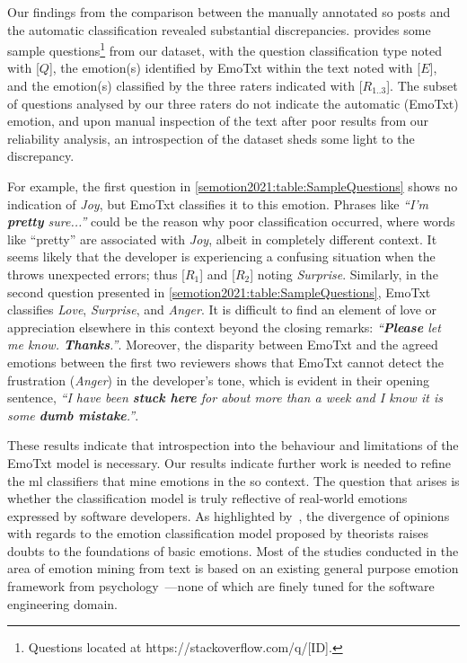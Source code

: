 Our findings from the comparison between the manually annotated \gls{so} posts and the automatic classification revealed substantial discrepancies.  provides some sample questions\footnote{Questions located at https://stackoverflow.com/q/[ID].} from our dataset, with the \citeauthor{Beyer:2018fm} question classification type noted with [$Q$], the emotion(s) identified by EmoTxt within the text noted with [$E$], and the emotion(s) classified by the three raters indicated with [$R_{1..3}$]. The subset of questions analysed by our three raters do not indicate the automatic (EmoTxt) emotion, and upon manual inspection of the text after poor results from our reliability analysis, an introspection of the dataset sheds some light to the discrepancy. 

For example, the first question in \cref{semotion2021:table:SampleQuestions} shows no indication of \textit{Joy}, but EmoTxt classifies it to this emotion. Phrases like \textit{``I'm \textbf{pretty} sure...''} could be the reason why poor classification occurred, where words like ``pretty'' are associated with \textit{Joy}, albeit in completely different context. It seems likely that the developer is experiencing a confusing situation when the  throws unexpected errors; thus [$R_{1}$] and [$R_{2}$] noting \textit{Surprise}.  Similarly, in the second question presented in \cref{semotion2021:table:SampleQuestions}, EmoTxt classifies \textit{Love}, \textit{Surprise}, and \textit{Anger}. It is difficult to find an element of love or appreciation elsewhere in this context beyond the closing remarks: \textit{``\textbf{Please} let me know. \textbf{Thanks}.''}. Moreover, the disparity between EmoTxt and the agreed emotions between the first two reviewers shows that EmoTxt cannot detect the frustration (\textit{Anger}) in the developer's tone, which is evident in their opening sentence, \textit{``I have been \textbf{stuck here} for about more than a week and I know it is some \textbf{dumb mistake}.''}. 

These results indicate that introspection into the behaviour and limitations of the EmoTxt model is necessary. Our results indicate further work is needed to refine the \gls{ml} classifiers that mine emotions in the \gls{so} context. The question that arises is whether the classification model is truly reflective of real-world emotions expressed by software developers. As highlighted by~\citet{curumsing2017}, the divergence of opinions with regards to the emotion classification model proposed by theorists raises doubts to the foundations of basic emotions. Most of the studies conducted in the area of emotion mining from text is based on an existing general purpose emotion framework from psychology~\citep{Ondrej:2016, ortu2016, novielli2018}---none of which are finely tuned for the software engineering domain. 

